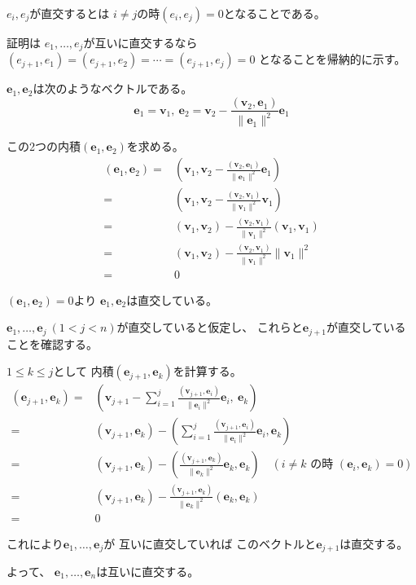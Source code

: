 \documentclass[12pt,b5paper]{ltjsarticle}
\begin{document}
\begin{enumerate}
       $e_i,e_j$が直交するとは
       $i\ne j$の時$(e_i,e_j)=0$となることである。

       証明は
       $e_1,\dots,e_j$が互いに直交するなら
       $(e_{j+1},e_1)=(e_{j+1},e_2)=\cdots =(e_{j+1},e_j)=0$
       となることを帰納的に示す。

       \dotfill

       $\bm{e}_1,\bm{e}_2$は次のようなベクトルである。
       \begin{equation}
       \bm{e}_1=\bm{v}_1
        ,\
        \bm{e}_2=\bm{v}_2
        -\frac{(\bm{v}_2,\bm{e}_1)}{\|\bm{e}_1\|^2}\bm{e}_1
       \end{equation}

       この2つの内積$(\bm{e}_1,\bm{e}_2)$を求める。
       \begin{align}
        (\bm{e}_1,\bm{e}_2)
        =& (\bm{v}_1
        ,
        \bm{v}_2-\frac{(\bm{v}_2,\bm{e}_1)}{\|\bm{e}_1\|^2}\bm{e}_1)\\
        =& (\bm{v}_1,
        \bm{v}_2-\frac{(\bm{v}_2,\bm{v}_1)}{\|\bm{v}_1\|^2}\bm{v}_1)\\
        =& (\bm{v}_1,\bm{v}_2)
        -\frac{(\bm{v}_2,\bm{v}_1)}{\|\bm{v}_1\|^2} (\bm{v}_1,\bm{v}_1)\\
        =& (\bm{v}_1,\bm{v}_2)
        -\frac{(\bm{v}_2,\bm{v}_1)}{\|\bm{v}_1\|^2} \|\bm{v}_1\|^2\\
        =& 0
       \end{align}

       $(\bm{e}_1,\bm{e}_2)=0$より
       $\bm{e}_1,\bm{e}_2$は直交している。

       $\bm{e}_1,\dots,\bm{e}_j\ (1<j<n)$が直交していると仮定し、
       これらと$\bm{e}_{j+1}$が直交していることを確認する。

       $1\leq k \leq j$として
       内積$(\bm{e}_{j+1},\bm{e}_{k})$を計算する。
       \begin{align}
        (\bm{e}_{j+1},\bm{e}_{k})
        =& \left(
        \bm{v}_{j+1}
        - \sum_{i=1}^{j} \frac{(\bm{v}_{j+1},\bm{e}_{i})}{\|\bm{e}_{i}\|^2}\bm{e}_{i}
        ,\ \bm{e}_{k} \right)\\
        =& (\bm{v}_{j+1},\bm{e}_{k})
        - \left( \sum_{i=1}^{j} \frac{(\bm{v}_{j+1},\bm{e}_{i})}{\|\bm{e}_{i}\|^2}\bm{e}_{i},\bm{e}_{k} \right)\\
        =& (\bm{v}_{j+1},\bm{e}_{k})
        - \left( \frac{(\bm{v}_{j+1},\bm{e}_{k})}{\|\bm{e}_{k}\|^2}\bm{e}_{k},\bm{e}_{k} \right)
        \quad ( i\ne k \text{ の時 }(\bm{e}_{i},\bm{e}_{k})=0 )\\
        =& (\bm{v}_{j+1},\bm{e}_{k})
        - \frac{(\bm{v}_{j+1},\bm{e}_{k})}{\|\bm{e}_{k}\|^2} (\bm{e}_{k},\bm{e}_{k} )\\
        =& 0
       \end{align}

       これにより$\bm{e}_{1},\dots,\bm{e}_{j}$が
       互いに直交していれば
       このベクトルと$\bm{e}_{j+1}$は直交する。

       よって、
       $\bm{e}_1,\dots,\bm{e}_n$は互いに直交する。

       \hrulefill

\end{enumerate}
\end{document}
